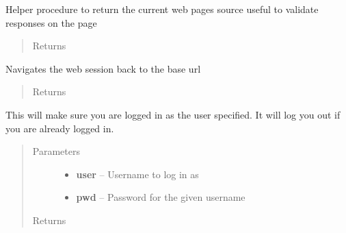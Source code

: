 \documentclass[letterpaper,10pt,english]{sphinxmanual}
\begin{document}
\begin{fulllineitems}

\begin{fulllineitems}
\label{STD/WebUI:WebUI.WebUI.WebUI.get_page}
Helper procedure to return the current web pages source useful to validate responses on the page
\begin{quote}\begin{description}
\item[{Returns}] \leavevmode


\end{description}\end{quote}

\end{fulllineitems}


\begin{fulllineitems}
\label{STD/WebUI:WebUI.WebUI.WebUI.go_home}
Navigates the web session back to the base url
\begin{quote}\begin{description}
\item[{Returns}] \leavevmode


\end{description}\end{quote}

\end{fulllineitems}


\begin{fulllineitems}
\label{STD/WebUI:WebUI.WebUI.WebUI.login}
This will make sure you are logged in as the user specified. It will log you out if you are already logged in.
\begin{quote}\begin{description}
\item[{Parameters}] \leavevmode\begin{itemize}
\item {} 
\textbf{user} -- Username to log in as

\item {} 
\textbf{pwd} -- Password for the given username

\end{itemize}

\item[{Returns}] \leavevmode



\end{description}
\end{quote}
\end{fulllineitems}
\end{fulllineitems}
\end{document}
